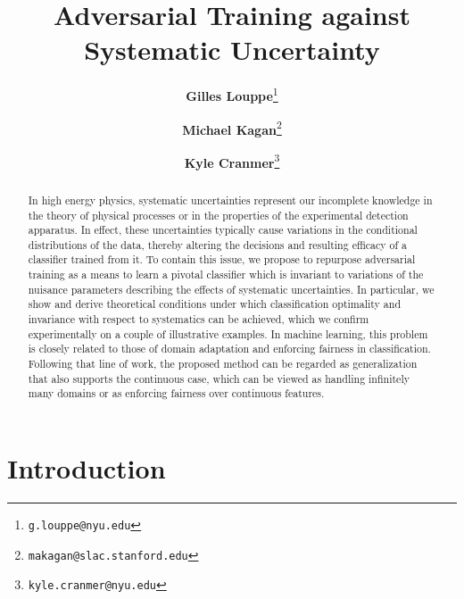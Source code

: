 \documentclass[twocolumn,superscriptaddress,aps]{revtex4-1}
\theoremstyle{plain}
\begin{document}

\title{\Large{Adversarial Training against Systematic Uncertainty}}
\vspace{1cm}
\author{\small{\bf Gilles Louppe}\thanks{\texttt{g.louppe@nyu.edu}}}
\author{\small{\bf Michael Kagan}\thanks{\texttt{makagan@slac.stanford.edu}}}
\author{\small{\bf Kyle Cranmer}\thanks{\texttt{kyle.cranmer@nyu.edu}}}

\begin{abstract}

In high energy physics, systematic uncertainties represent our incomplete
knowledge in the theory of physical processes or in the properties of the
experimental detection apparatus. In effect, these uncertainties typically cause
variations in the conditional distributions of the data, thereby altering the
decisions and resulting efficacy of a classifier trained from it. To contain
this issue, we propose to repurpose adversarial training as a means to learn a
pivotal classifier which is invariant to variations of the nuisance parameters
describing the effects of systematic uncertainties. In particular, we show and
derive theoretical conditions under which classification optimality and
invariance with respect to systematics can be achieved, which we confirm
experimentally on a couple of illustrative examples. In machine learning, this
problem is closely related to those of domain adaptation and enforcing fairness
in classification. Following that line of work, the proposed method can be
regarded as generalization that also supports the continuous case, which can be
viewed as handling infinitely many domains or as enforcing fairness over
continuous features.

\end{abstract}

\maketitle



\section{Introduction}
\end{document}
